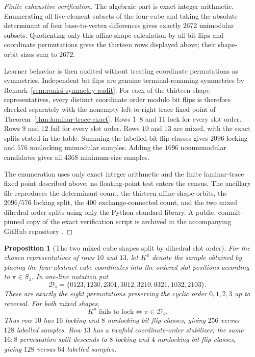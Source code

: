 \documentclass[11pt]{article}
\newtheorem{proposition}[definition]{Proposition}
\begin{document}
\begin{proof}[Finite exhaustive verification]
The algebraic part is exact integer arithmetic.  Enumerating all five-element
subsets of the four-cube and taking the absolute determinant of four
base-to-vertex differences gives exactly $2672$ unimodular subsets.  Quotienting
only this affine-shape calculation by all bit flips and coordinate permutations
gives the thirteen rows displayed above; their shape-orbit sizes sum to $2672$.

Learner behavior is then audited without treating coordinate permutations as
symmetries.  Independent bit flips are genuine terminal-renaming symmetries by
Remark~\ref{rem:rank4-symmetry-audit}.  For each of the thirteen shape
representatives, every distinct coordinate order modulo bit flips is therefore
checked separately with the nonempty left-to-right trace fixed point of
Theorem~\ref{thm:laminar-trace-exact}.  Rows $1$--$8$ and $11$ lock for every
slot order.  Rows $9$ and $12$ fail for every slot order.  Rows $10$ and $13$
are mixed, with the exact splits stated in the table.  Summing the labelled
bit-flip classes gives $2096$ locking and $576$ nonlocking unimodular samples.
Adding the $1696$ nonunimodular candidates gives all $4368$ minimum-size
samples.

The enumeration uses only exact integer arithmetic and the finite
laminar-trace fixed point described above; no floating-point test enters the
census.  The ancillary file
 reproduces the determinant count,
the thirteen affine-shape orbits, the $2096/576$ locking split, the $400$
exchange-connected count, and the two mixed dihedral order splits using only
the Python standard library.  A public, commit-pinned copy of the exact
verification script is archived in the accompanying GitHub repository
\cite{KuriyamaOFETCode}.
\end{proof}

\begin{proposition}[The two mixed cube shapes split by dihedral slot order]
\label{prop:rank4-dihedral-split}
For the chosen representatives of rows $10$ and $13$, let
$K^{\pi}$ denote the sample obtained by placing the four abstract cube
coordinates into the ordered slot positions according to
$\pi\in S_4$.  In one-line notation put
\[
 \mathcal D_4
 =\{0123,1230,2301,3012,3210,0321,1032,2103\}.
\]
These are exactly the eight permutations preserving the cyclic order
$0,1,2,3$ up to reversal.  For both mixed shapes,
\[
 \boxed{
 K^{\pi}\text{ fails to lock}
 \iff
 \pi\in\mathcal D_4.
 }
\]
Thus row $10$ has $16$ locking and $8$ nonlocking bit-flip classes, giving
$256$ versus $128$ labelled samples.  Row $13$ has a twofold coordinate-order
stabilizer; the same $16:8$ permutation split descends to $8$ locking and $4$
nonlocking bit-flip classes, giving $128$ versus $64$ labelled samples.
\end{proposition}
\end{document}

